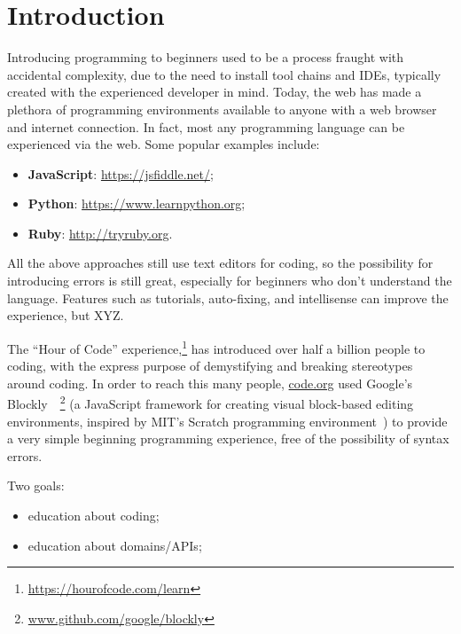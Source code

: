 \section{Introduction}


Introducing programming to beginners used to be a process fraught with
accidental complexity, due to the need to install tool chains and IDEs, 
typically created with the experienced developer in mind. Today, 
the web has made a plethora of programming environments available 
to anyone with a web browser and internet connection. In fact, most any programming
language can be experienced via the web. Some popular examples include:
\begin{itemize}
\item {\bf JavaScript}: \url{https://jsfiddle.net/};
\item {\bf Python}: \url{https://www.learnpython.org};
\item {\bf Ruby}: \url{http://tryruby.org}.
\end{itemize}
All the above approaches still use text editors for coding, so the possibility
for introducing errors is still great, especially for beginners who don't understand
the language.   Features such as tutorials, auto-fixing, and intellisense can
improve the experience, but XYZ. 


The ``Hour of Code'' experience,\footnote{\url{https://hourofcode.com/learn}} 
has introduced over half a billion people to coding, with the express purpose 
of demystifying and breaking stereotypes around coding.
In order to reach this many people, \url{code.org} used
Google's Blockly~\cite{Blocky2015}~\footnote{\url{www.github.com/google/blockly}}
(a JavaScript framework for creating visual block-based editing environments, 
inspired by MIT's Scratch programming environment~\cite{ScratchCACM2009})
to provide a very simple beginning programming experience, free of the possibility
of syntax errors. 

Two goals: 
\begin{itemize}
    \item education about coding; 
    \item education about domains/APIs;
\end{itemize}


